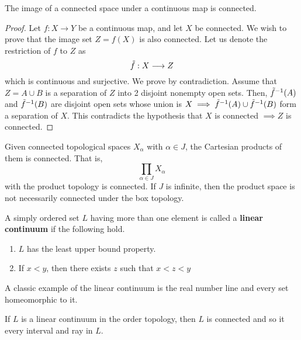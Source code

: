   \begin{theorem}
    The image of a connected space under a continuous map is connected. 
  \end{theorem}
  \begin{proof}
    Let $f: X \longrightarrow Y$ be a continuous map, and let $X$ be connected. We wish to prove that the image set $Z = f(X)$ is also connected. Let us denote the restriction of $f$ to $Z$ as
    \begin{equation}
      \Tilde{f}: X \longrightarrow Z
    \end{equation}
    which is continuous and surjective. We prove by contradiction. Assume that $Z = A \cup B$ is a separation of $Z$ into 2 disjoint nonempty open sets. Then, $\Tilde{f}^{-1} (A)$ and $\Tilde{f}^{-1}(B)$ are disjoint open sets whose union is $X \implies \Tilde{f}^{-1} (A) \cup \Tilde{f}^{-1}(B)$ form a separation of $X$. This contradicts the hypothesis that $X$ is connected $\implies Z$ is connected.  
  \end{proof}

  \begin{theorem}
    Given connected topological spaces $X_\alpha$ with $\alpha \in J$, the Cartesian products of them is connected. That is, 
    \begin{equation}
      \prod_{\alpha \in J} X_\alpha
    \end{equation}
    with the product topology is connected. If $J$ is infinite, then the product space is not necessarily connected under the box topology. 
  \end{theorem}

  \begin{definition}
    A simply ordered set $L$ having more than one element is called a \textbf{linear continuum} if the following hold. 
    \begin{enumerate}
      \item $L$ has the least upper bound property. 
      \item If $x <y$, then there exists $z$ such that $x<z<y$
    \end{enumerate}
    A classic example of the linear continuum is the real number line and every set homeomorphic to it. 
  \end{definition}

  \begin{theorem}
    If $L$ is a linear continuum in the order topology, then $L$ is connected and so it every interval and ray in $L$. 
  \end{theorem}


